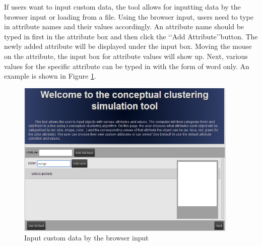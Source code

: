 If users want to input custom data, the tool allows for inputting data by the browser input or loading from a file. Using the browser input, users need to type in attribute names and their values accordingly. An attribute name should be typed in first in the attribute box and then click the \lq\lq{Add Attribute}\rq\rq button. The newly added attribute will be displayed under the input box. Moving the mouse on the attribute, the input box for attribute values will show up. Next, various values for the specific attribute can be typed in with the form of word only. An example is shown in Figure \ref{Fig:intf2}. 
 \begin{figure}[h!]
        \centering
        \includegraphics[width=300pt]{../images/interface2.jpg}
        \caption{Input custom data by the browser input}
        \label{Fig:intf2}
    \end{figure}

